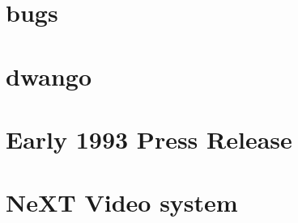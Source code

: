\documentclass{book}
\begin{document}
      \chapter{bugs}
      
      \chapter{dwango}
      
      \chapter{Early 1993 Press Release}
      
      \chapter{NeXT Video system}
      
    \cleartoleftpage %
    
    \blankpage
    \blankpage
\end{document}
